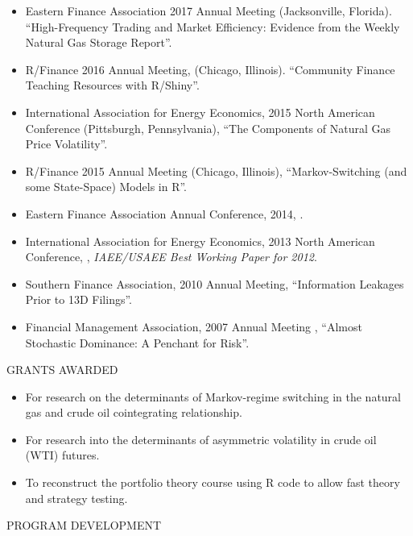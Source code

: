 \documentclass[9pt]{article}
\begin{document}
\begin{itemize}[noitemsep, nolistsep]
  \item Eastern Finance Association 2017 Annual Meeting (Jacksonville, Florida). ``High-Frequency Trading and Market Efficiency: Evidence from the Weekly Natural Gas Storage Report''.
\item  R/Finance 2016 Annual Meeting, (Chicago, Illinois). ``Community Finance Teaching Resources with R/Shiny''.
\item  International Association for Energy Economics, 2015 North American Conference (Pittsburgh, Pennsylvania), ``The Components of Natural Gas Price Volatility''.
\item  R/Finance 2015 Annual Meeting (Chicago, Illinois), ``Markov-Switching (and some State-Space) Models in R''.
\item Eastern Finance Association Annual Conference, 2014, \href{http://ssrn.com/abstract=2371753}{\color{Blue}{The Switching Relationship between Natural Gas and Crude Oil Prices}}.
\item International Association for Energy Economics, 2013 North American Conference, \href{http://papers.ssrn.com/sol3/papers.cfm?abstract_id=2194215}{\color{Blue}{``The Switching Relationship between Natural Gas and Oil Prices''}}, {\it IAEE/USAEE Best Working Paper for 2012}. 
\item Southern Finance Association, 2010 Annual Meeting, ``Information Leakages Prior to 13D Filings''.
\item Financial Management Association, 2007 Annual Meeting , ``Almost Stochastic Dominance: A Penchant for Risk''.
\end{itemize}
\vspace{10pt}
GRANTS AWARDED
\begin{itemize}[noitemsep, nolistsep]
\item For research on the determinants of Markov-regime switching in the natural gas and crude oil cointegrating relationship. 
\item For research into the determinants of asymmetric volatility in crude oil (WTI) futures. 
\item To reconstruct the portfolio theory course using R code to allow fast theory and strategy testing.
\end{itemize}
\vspace{10pt}
PROGRAM DEVELOPMENT
\end{document}
